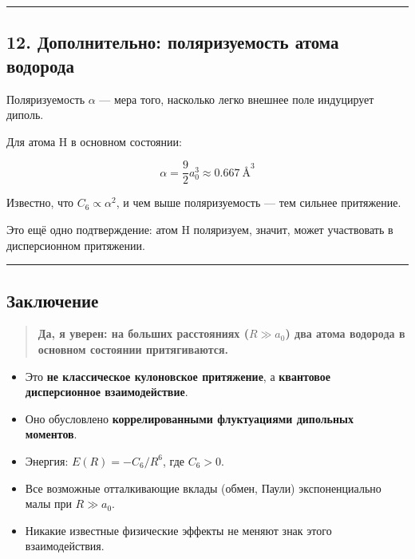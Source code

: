 \documentclass[11pt]{article}
\providecommand{\tightlist}{%
      \setlength{\itemsep}{0pt}\setlength{\parskip}{0pt}}
\begin{document}
\begin{center}\rule{0.5\linewidth}{\linethickness}\end{center}

\subsection{12. Дополнительно: поляризуемость атома
водорода}\label{ux434ux43eux43fux43eux43bux43dux438ux442ux435ux43bux44cux43dux43e-ux43fux43eux43bux44fux440ux438ux437ux443ux435ux43cux43eux441ux442ux44c-ux430ux442ux43eux43cux430-ux432ux43eux434ux43eux440ux43eux434ux430}

Поляризуемость \(\alpha\) --- мера того, насколько легко внешнее поле
индуцирует диполь.

Для атома H в основном состоянии:

\[
\alpha = \frac{9}{2} a_0^3 \approx 0.667~\text{Å}^3
\]

Известно, что \(C_6 \propto \alpha^2\), и чем выше поляризуемость ---
тем сильнее притяжение.

Это ещё одно подтверждение: атом H поляризуем, значит, может участвовать
в дисперсионном притяжении.

\begin{center}\rule{0.5\linewidth}{\linethickness}\end{center}

\subsection{Заключение}\label{ux437ux430ux43aux43bux44eux447ux435ux43dux438ux435}

\begin{quote}
\textbf{Да, я уверен: на больших расстояниях (\(R \gg a_0\)) два атома
водорода в основном состоянии притягиваются.}
\end{quote}

\begin{itemize}
\tightlist
\item
  Это \textbf{не классическое кулоновское притяжение}, а
  \textbf{квантовое дисперсионное взаимодействие}.
\item
  Оно обусловлено \textbf{коррелированными флуктуациями дипольных
  моментов}.
\item
  Энергия: \(E(R) = -C_6 / R^6\), где \(C_6 > 0\).
\item
  Все возможные отталкивающие вклады (обмен, Паули) экспоненциально малы
  при \(R \gg a_0\).
\item
  Никакие известные физические эффекты не меняют знак этого
  взаимодействия.
\end{itemize}
\end{document}
